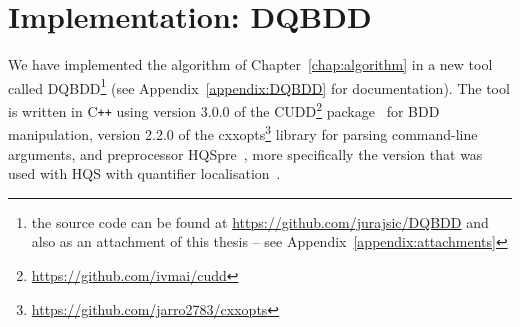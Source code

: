 \documentclass[
  digital, %
  color,
  twoside, %
  table,   %
  nolof,     %
  nolot,     %
]{fithesis3}
\theoremstyle{definition}
\theoremstyle{remark}
\newcommand{\vars}[1]{V_{#1}}
\newcommand{\prefix}[1]{Q({#1})}
\newcommand{\eprefix}[1]{Q_{\exists}(#1)}
\newcommand{\uprefix}[1]{Q_{\forall}(#1)}
\newcommand{\children}[1]{children({#1})}
\newcommand{\Cplusplus}{C\texttt{++}}
\begin{document}
\begin{itemize}
\end{itemize}



\chapter{Implementation: DQBDD}
\label{chap:implementation}
\begin{sloppypar}
We have implemented the algorithm of Chapter~\ref{chap:algorithm} in a new tool called DQBDD\footnote{the source code can be found at \url{https://github.com/jurajsic/DQBDD} and also as an attachment of this thesis -- see Appendix~\ref{appendix:attachments}} (see Appendix~\ref{appendix:DQBDD} for documentation). The tool is written in \Cplusplus{} using version 3.0.0 of the CUDD\footnote{\url{https://github.com/ivmai/cudd}} package~\cite{CUDD} for BDD manipulation, version 2.2.0 of the cxxopts\footnote{\url{https://github.com/jarro2783/cxxopts}} library for parsing command-line arguments, and pre\-pro\-ces\-sor HQSpre~\cite{HQSpre2}, more specifically the version that was used with HQS with quantifier localisation~\cite{HQSquantifierLocalisation}.
\end{sloppypar}
\end{document}
